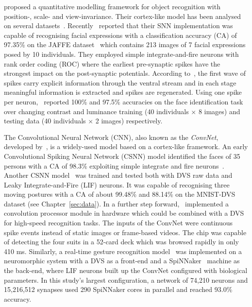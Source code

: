 \documentclass{frontiersENG} %
\begin{document}
\cite{riesenhuber1999hierarchical} proposed a quantitative modelling framework for object recognition with position-, scale- and view-invariance.
Their cortex-like model has been analysed on several datasets~\citep{serre2007robust}.
Recently~\cite{fu2012spiking} reported that their SNN implementation was capable of recognising facial expressions with a classification accuracy (CA) of 97.35\% on the JAFFE dataset~\citep{lyons1998coding} which contains 213 images of 7 facial expressions posed by 10 individuals.
They employed simple integrate-and-fire neurons with rank order coding (ROC) where the earliest pre-synaptic spikes have the strongest impact on the post-synaptic potentials.
According to~\cite{vanrullen2002surfing}, the first wave of spikes carry explicit information through the ventral stream and in each stage meaningful information is extracted and spikes are regenerated. 
Using one spike per neuron,~\cite{delorme2001face} reported 100\% and 97.5\% accuracies on the face identification task over changing  contrast and luminance training (40 individuals $\times$ 8 images) and testing data (40 individuals $\times$ 2 images) respectively.

The Convolutional Neural Network (CNN), also known as the \textit{ConvNet}, developed by~\cite{lecun1998gradient}, is a widely-used model based on a cortex-like framework.
An early Convolutional Spiking Neural Network (CSNN) model identified the faces of 35 persons with a CA of 98.3\% exploiting simple integrate and fire neurons~\citep{matsugu2002convolutional}.
Another CSNN model~\citep{zhao2014feedforward} was trained and tested both with DVS raw data and Leaky Integrate-and-Fire (LIF) neurons.
It was capable of recognising three moving postures with a CA of about 99.48\% and 88.14\% on the MNIST-DVS dataset (see Chapter~\ref{sec:data}).
In a further step forward,~\cite{camunas2012event} implemented a convolution processor module in hardware which could be combined with a DVS for high-speed recognition tasks.
The inputs of the ConvNet were continuous spike events instead of static images or frame-based videos. 
The chip was capable of detecting the four suits in a 52-card deck which was browsed rapidly in only 410 ms.
Similarly, a real-time gesture recognition model~\citep{liu2014real} was implemented on a neuromorphic system with a DVS as a front-end and a SpiNNaker~\citep{furber2014spinnaker} machine as the back-end, where LIF neurons built up the ConvNet configured with biological parameters.
In this study's largest configuration, a network of 74,210 neurons and 15,216,512 synapses used 290 SpiNNaker cores in parallel and reached 93.0\% accuracy. 
\end{document}
